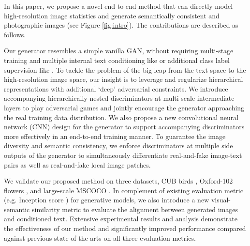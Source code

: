 \documentclass[10pt,twocolumn,letterpaper]{article}
\begin{document}
In this paper, we propose a novel end-to-end method that can directly model high-resolution image statistics and generate semantically consistent and photographic images (see Figure \ref{fig:intro}). The contributions are described as follows.

Our generator resembles a simple vanilla GAN, without requiring multi-stage training and multiple internal text conditioning like \cite{han2017stackgan} or additional class label supervision like \cite{dash2017tac}. To tackle the problem of the big leap from the text space to the high-resolution image space, our insight is to leverage and regularize hierarchical representations with additional `deep' adversarial constraints. 
We introduce accompanying hierarchically-nested discriminators at multi-scale intermediate layers to play adversarial games and jointly encourage the generator approaching the real training data distribution. 
We also propose a new convolutional neural network (CNN) design for the generator to support accompanying discriminators more effectively in an end-to-end training manner.
To guarantee the image diversity and semantic consistency, we enforce discriminators at multiple side outputs of the generator to simultaneously differentiate real-and-fake image-text pairs as well as real-and-fake local image patches. %




We validate our proposed method on three datasets, CUB birds \cite{welinder2010caltech}, Oxford-102 flowers \cite{Nilsback08}, and large-scale MSCOCO \cite{lin2014microsoft}. In complement of existing evaluation metric (e.g. Inception score \cite{improvedGAN}) for generative models, we also introduce a new visual-semantic similarity metric to evaluate the alignment between generated images and conditioned text. Extensive experimental results and analysis demonstrate the effectiveness of our method and significantly improved performance compared against previous state of the arts on all three evaluation metrics. 
\end{document}
